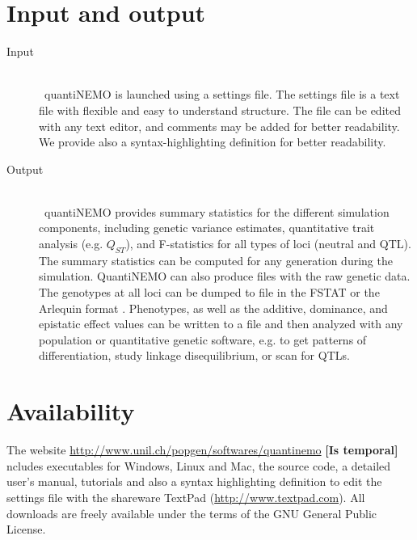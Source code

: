 \documentclass[letterpaper,12pt,oneside]{book}
\newcommand{\tbc}[1]{\small {\bf \color{red} [Is temporal]} \normalsize} %
\begin{document}
\section{Input and output}
\begin{description}
\item[Input]\hspace*{\fill}\\\
quantiNEMO is launched using a settings file. The settings file is a text file with flexible and easy to understand structure. The file can be edited with any text editor, and comments may be added for better readability. We provide also a syntax-highlighting definition for better readability.  

\item[Output]\hspace*{\fill}\\\
quantiNEMO provides summary statistics for the different simulation components, including genetic variance estimates, quantitative trait analysis (e.g. $Q_{ST}$), and F-statistics for all types of loci (neutral and QTL). The summary statistics can be computed for any generation during the simulation. QuantiNEMO can also produce files with the raw genetic data. The genotypes at all loci can be dumped to file in the FSTAT \citep{Goudet_1995} or the Arlequin format \citep{Excoffier_2010}. Phenotypes, as well as the additive, dominance, and epistatic effect values can be written to a file and then analyzed with any population or quantitative genetic software, e.g.  to get patterns of differentiation, study linkage disequilibrium, or scan for QTLs.
\end{description}

\section{Availability}
The website \linebreak\url{http://www.unil.ch/popgen/softwares/quantinemo} \tbc includes executables for Windows, Linux and Mac, the source code, a detailed user's manual, tutorials and also a syntax highlighting definition to edit the settings file with the shareware TextPad (\linebreak\url{http://www.textpad.com}). All downloads are freely available under the terms of the GNU General Public License.
\end{document}
